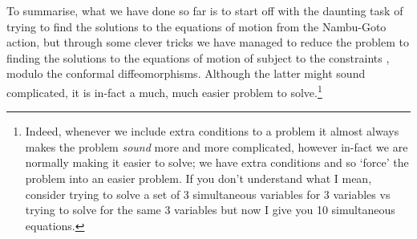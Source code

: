 To summarise, what we have done so far is to start off with the daunting task of trying to find the solutions to the equations of motion from the Nambu-Goto action, but through some clever tricks we have managed to reduce the problem to finding the solutions to the equations of motion of  subject to the constraints , modulo the conformal diffeomorphisms. Although the latter might sound complicated, it is in-fact a much, much easier problem to solve.\footnote{Indeed, whenever we include extra conditions to a problem it almost always makes the problem \textit{sound} more and more complicated, however in-fact we are normally making it easier to solve; we have extra conditions and so `force' the problem into an easier problem. If you don't understand what I mean, consider trying to solve a set of 3 simultaneous variables for 3 variables vs trying to solve for the same 3 variables but now I give you 10 simultaneous equations.} 
